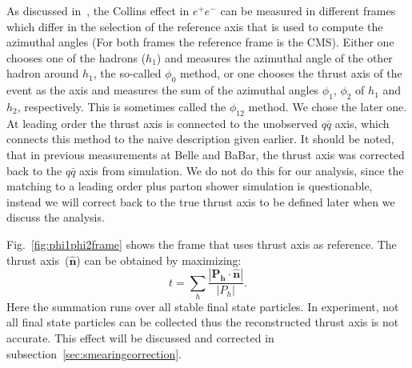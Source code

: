 As discussed in~\cite{BoerThesis, Boer:2008fr}, the Collins effect in $e^+e^-$ can be measured in different frames which differ in the selection of the reference axis that is used to compute the azimuthal angles (For both frames the reference frame is the CMS). Either one chooses one of the hadrons ($h_1$) and measures the azimuthal angle of the other hadron around $h_1$, the so-called $\phi_0$ method, or one chooses the thrust axis of the event as the axis and measures the sum of the azimuthal angles $\phi_1$, $\phi_2$ of $h_1$ and $h_2$, respectively. This is sometimes called the $\phi_{12}$ method. We chose the later one. At leading order the thrust axis is connected to the unobserved $q \bar q$ axis, which connects this method to the naive description given earlier. It should be noted, that in previous measurements at Belle and BaBar, the thrust axis was corrected back to the $q \bar q$ axis from simulation. We do not do this for our analysis, since the matching to a leading order plus parton shower simulation is questionable, instead we will correct back to the true thrust axis to be defined later when we discuss the analysis.

Fig.~\ref{fig:phi1phi2frame} shows the frame that uses thrust axis as reference. The thrust axis~($\boldsymbol{\hat{n}}$) can be obtained by  maximizing:
\begin{equation}
\label{eq:thrust}
t=\sum_h\frac{|\boldsymbol{P_h\cdot\hat{n}}|}{|P_h|}.
\end{equation}
Here the summation runs over all stable final state particles. In experiment, not all final state particles can be collected thus the reconstructed thrust axis is not accurate. This effect will be discussed and corrected in subsection~\ref{sec:smearingcorrection}. 

